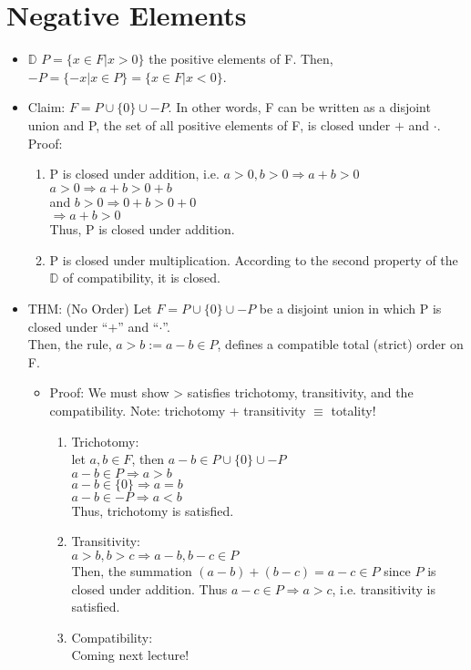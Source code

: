 \documentclass[11pt]{article}
\begin{document}
\section{Negative Elements}
\label{sec:orgf4c529e}
\begin{itemize}
\item \(\mathbb{D}\) \(P=\{x\in F | x>0\}\) the positive elements of F. Then, \(-P = \{-x | x \in P\} = \{x \in F | x < 0\}\).
\item Claim: \(F = P \cup \{0\} \cup -P\). In other words, F can be written as a disjoint union and P, the set of all positive elements of F, is closed under \(+\) and \(\cdot\).\\[0pt]
Proof:
\begin{enumerate}
\item P is closed under addition, i.e. \(a >0, b>0 \Rightarrow a+b > 0\)\\[0pt]
\(a > 0 \Rightarrow a+b > 0 + b\) \\[0pt]
and \(b > 0 \Rightarrow 0 + b > 0 + 0\)\\[0pt]
\(\Rightarrow a+b > 0\)\\[0pt]
Thus, P is closed under addition.
\item P is closed under multiplication. According to the second property of the \(\mathbb{D}\) of compatibility, it is closed.
\end{enumerate}
\item THM: (No Order) Let \(F = P \cup \{0\} \cup -P\) be a disjoint union in which P is closed under ``\(+\)'' and ``\(\cdot\)''. \\[0pt]
Then, the rule, \(a > b := a-b\in P\), defines a compatible total (strict) order on F.
\begin{itemize}
\item Proof: We must show > satisfies trichotomy, transitivity, and the compatibility. Note: trichotomy + transitivity \(\equiv\) totality!
\begin{enumerate}
\item Trichotomy:\\[0pt]
let \(a, b \in F\), then \(a -b \in P \cup\{0\}\cup -P\)\\[0pt]
\(a-b\in P \Rightarrow a >b\)\\[0pt]
\(a-b \in \{0\} \Rightarrow a = b\)\\[0pt]
\(a- b \in -P \Rightarrow a < b\)\\[0pt]
Thus, trichotomy is satisfied.
\item Transitivity:\\[0pt]
\(a > b, b > c \Rightarrow a-b, b-c \in P\)\\[0pt]
Then, the summation \((a-b) + (b-c) = a-c \in P\) since \(P\) is closed under addition.
Thus \(a-c\in P \Rightarrow a > c\), i.e. transitivity is satisfied.
\item Compatibility:\\[0pt]
Coming next lecture!
\end{enumerate}
\end{itemize}
\end{itemize}
\end{document}
